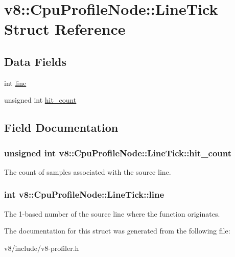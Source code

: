 \hypertarget{structv8_1_1CpuProfileNode_1_1LineTick}{}\section{v8\+:\+:Cpu\+Profile\+Node\+:\+:Line\+Tick Struct Reference}
\label{structv8_1_1CpuProfileNode_1_1LineTick}
\subsection*{Data Fields}
\begin{DoxyCompactItemize}
\item 
int \hyperlink{structv8_1_1CpuProfileNode_1_1LineTick_af96fbdefbc07b2c84cf41d74555626f6}{line}
\item 
unsigned int \hyperlink{structv8_1_1CpuProfileNode_1_1LineTick_a62653fb1e6d381a5747d24b83aab1c1b}{hit\+\_\+count}
\end{DoxyCompactItemize}


\subsection{Field Documentation}
\subsubsection[{\texorpdfstring{hit\+\_\+count}{hit_count}}]{\setlength{\rightskip}{0pt plus 5cm}unsigned int v8\+::\+Cpu\+Profile\+Node\+::\+Line\+Tick\+::hit\+\_\+count}\hypertarget{structv8_1_1CpuProfileNode_1_1LineTick_a62653fb1e6d381a5747d24b83aab1c1b}{}\label{structv8_1_1CpuProfileNode_1_1LineTick_a62653fb1e6d381a5747d24b83aab1c1b}
The count of samples associated with the source line. 
\subsubsection[{\texorpdfstring{line}{line}}]{\setlength{\rightskip}{0pt plus 5cm}int v8\+::\+Cpu\+Profile\+Node\+::\+Line\+Tick\+::line}\hypertarget{structv8_1_1CpuProfileNode_1_1LineTick_af96fbdefbc07b2c84cf41d74555626f6}{}\label{structv8_1_1CpuProfileNode_1_1LineTick_af96fbdefbc07b2c84cf41d74555626f6}
The 1-\/based number of the source line where the function originates. 

The documentation for this struct was generated from the following file\+:\begin{DoxyCompactItemize}
\item 
v8/include/v8-\/profiler.\+h\end{DoxyCompactItemize}

